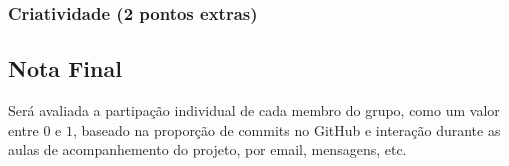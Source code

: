 \documentclass[11pt]{article}
\begin{document}
\subsubsection{Criatividade (2 pontos extras)}
\label{sec:org7f99acd}
\subsection{Nota Final}
\label{sec:orgbe45012}

Será avaliada a partipação individual de cada membro do grupo, como um
valor entre \(0\) e \(1\), baseado na proporção de commits no GitHub e
interação durante as aulas de acompanhemento do projeto, por email,
mensagens, etc.
\end{document}
